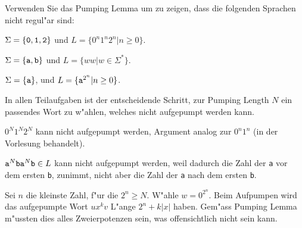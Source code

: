 Verwenden Sie das Pumping Lemma um zu zeigen, dass die folgenden
Sprachen nicht regul"ar sind:
\begin{teilaufgaben}
\item $\Sigma=\{{\tt 0},{\tt 1},{\tt 2}\}$ und $L=\{ 0^n1^n2^n |n\ge 0\}$.
\item $\Sigma=\{{\tt a},{\tt b}\}$ und $L=\{ww|w\in \Sigma^*\}$.
\item $\Sigma=\{{\tt a}\}$, und $L=\{{\tt a}^{2^n}|n\ge 0\}$.
\end{teilaufgaben}

\begin{loesung}
In allen Teilaufgaben ist der entscheidende Schritt, zur Pumping Length
$N$ ein passendes Wort zu w"ahlen, welches nicht aufgepumpt werden kann.
\begin{teilaufgaben}
\item $0^N1^N2^N$ kann nicht aufgepumpt werden, Argument analog zur
$0^n1^n$ (in der Vorlesung behandelt).
\item ${\tt a}^N{\tt ba}^N{\tt b}\in L$ kann nicht aufgepumpt werden,
weil dadurch die Zahl der {\tt a} vor dem ersten {\tt b}, zunimmt,
nicht aber die Zahl der {\tt a} nach dem ersten {\tt b}.
\item
Sei $n$ die kleinste Zahl, f"ur die $2^n\ge N$. W"ahle $w=0^{2^n}$.
Beim Aufpumpen wird das aufgepumpte Wort $ux^kv$ L"ange $2^n+k|x|$
haben. Gem"ass Pumping Lemma m"ussten dies alles Zweierpotenzen sein,
was offensichtlich nicht sein kann.
\qedhere
\end{teilaufgaben}
\end{loesung}


